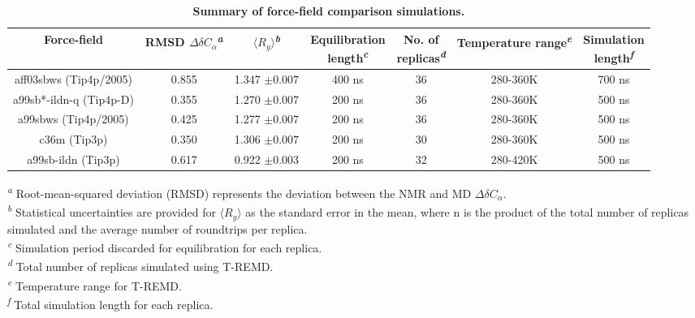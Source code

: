 \documentclass{article}
\begin{document}
\renewcommand{\thetable}{S\arabic{table}}
\begin{table}[!ht]
\begin{adjustwidth}{-1.25in}{0in} %
\centering
\caption{\bf Summary of force-field comparison simulations.}
\label{table2}
\begin{tabular}{|c|c|c|c|c|c|c|} 
\hline 
Force-field & \makecell{RMSD \\ $\Delta$$\delta$$C_{\alpha}$}\textsuperscript{\emph{a}} & $\langle R_{g} \rangle$\textsuperscript{\emph{b}} & \makecell{Equilibration\\length}\textsuperscript{\emph{c}} & \makecell{No. of\\replicas}\textsuperscript{\emph{d}} & Temperature range\textsuperscript{\emph{e}} & \makecell{Simulation\\length}\textsuperscript{\emph{f}} \\
\hline
aff03sbws (Tip4p/2005) & 0.855 & 1.347 $\pm{0.007}$ & 400 ns & 36 & 280-360K & 700 ns \\
\hline
a99sb*-ildn-q (Tip4p-D) & 0.355 & 1.270 $\pm{0.007}$ & 200 ns & 36 & 280-360K & 500 ns\\
\hline
a99sbws (Tip4p/2005) & 0.425 & 1.277 $\pm{0.007}$ & 200 ns & 36 & 280-360K & 500 ns\\
\hline
c36m (Tip3p) & 0.350 & 1.306 $\pm{0.007}$ & 200 ns & 30 & 280-360K & 500 ns\\
\hline
a99sb-ildn (Tip3p) & 0.617 & 0.922 $\pm{0.003}$ & 200 ns & 32 & 280-420K & 500 ns\\
\hline
\end{tabular}
\begin{flushleft}
\textsuperscript{\emph{a}} Root-mean-squared deviation (RMSD) represents the deviation between the NMR and MD $\Delta$$\delta$$C_{\alpha}$.\\
\textsuperscript{\emph{b}} Statistical uncertainties are provided for $\langle R_{g} \rangle$ as the standard error in the mean, where n is the product of the total number of replicas simulated and the average number of roundtrips per replica.\\
\textsuperscript{\emph{c}} Simulation period discarded for equilibration for each replica.\\
\textsuperscript{\emph{d}} Total number of replicas simulated using T-REMD.\\
\textsuperscript{\emph{e}} Temperature range for T-REMD.\\
\textsuperscript{\emph{f}} Total simulation length for each replica.\\
\end{flushleft}
\end{adjustwidth}
\end{table}
\end{document}
